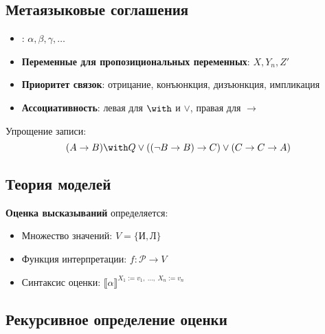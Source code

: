 \subsection{Метаязыковые соглашения}

\begin{itemize}
\item {}: $\alpha, \beta, \gamma, \dots$
\item \textbf{Переменные для пропозициональных переменных}: $X, Y_n, Z'$
\item \textbf{Приоритет связок}: отрицание, конъюнкция, дизъюнкция, импликация
\item \textbf{Ассоциативность}: левая для $\with$ и $\vee$, правая для $\rightarrow$
\end{itemize}

\begin{exmprus}
Упрощение записи:
$$(A\rightarrow B)\with Q\vee((\neg B\rightarrow B) \rightarrow C) \vee (C \rightarrow C\rightarrow A)$$
\end{exmprus}

\subsection{Теория моделей}


\begin{defrus}
\textbf{Оценка высказываний} определяется:
\begin{itemize}
\item Множество значений: $V = \{\textit{И},\textit{Л}\}$
\item Функция интерпретации: $f: \mathcal{P} \rightarrow V$
\item Синтаксис оценки: $\llbracket \alpha \rrbracket^{X_1 := v_1,\ \dots,\ X_n := v_n}$
\end{itemize}
\end{defrus}

\subsection*{Рекурсивное определение оценки}

